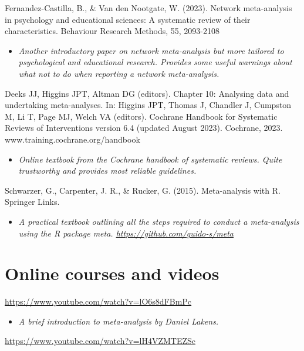 \documentclass[
]{book}
\providecommand{\tightlist}{%
  \setlength{\itemsep}{0pt}\setlength{\parskip}{0pt}}
\begin{document}
Fernandez-Castilla, B., \& Van den Nootgate, W. (2023). Network meta-analysis in psychology and educational sciences: A systematic review of their characteristics. Behaviour Research Methods, 55, 2093-2108

\begin{itemize}
\tightlist
\item
  \emph{Another introductory paper on network meta-analysis but more tailored to psychological and educational research. Provides some useful warnings about what not to do when reporting a network meta-analysis.}
\end{itemize}

Deeks JJ, Higgins JPT, Altman DG (editors). Chapter 10: Analysing data and undertaking meta-analyses. In: Higgins JPT, Thomas J, Chandler J, Cumpston M, Li T, Page MJ, Welch VA (editors). Cochrane Handbook for Systematic Reviews of Interventions version 6.4 (updated August 2023). Cochrane, 2023. www.training.cochrane.org/handbook

\begin{itemize}
\tightlist
\item
  \emph{Online textbook from the Cochrane handbook of systematic reviews. Quite trustworthy and provides most reliable guidelines.}
\end{itemize}

Schwarzer, G., Carpenter, J. R., \& Rucker, G. (2015). Meta-analysis with R. Springer Links.

\begin{itemize}
\tightlist
\item
  \emph{A practical textbook outlining all the steps required to conduct a meta-analysis using the R package meta. \url{https://github.com/guido-s/meta} }
\end{itemize}

\section{Online courses and videos}\label{online-courses-and-videos-3}

\url{https://www.youtube.com/watch?v=lO6s8dFBmPc}

\begin{itemize}
\tightlist
\item
  \emph{A brief introduction to meta-analysis by Daniel Lakens.}
\end{itemize}

\url{https://www.youtube.com/watch?v=lH4VZMTEZSc}
\end{document}

